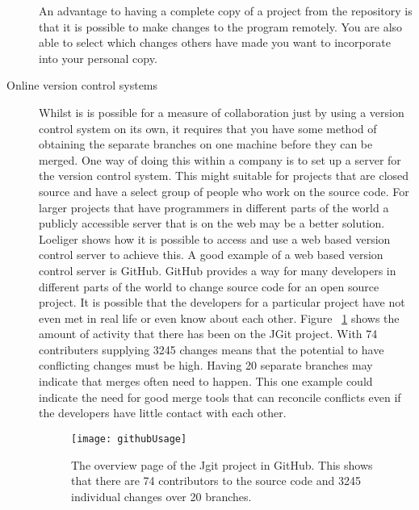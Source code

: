 \begin{description}
  An advantage to having a complete copy of a project from the repository is that it is possible to make changes to the program remotely.  You are also able to select which changes others have made you want to incorporate into your personal copy. 
  \item [Online version control systems]  
  Whilst is is possible for a measure of collaboration just by using a version control system on its own, it requires that you have some method of obtaining the separate branches on one machine before they can be merged.  One way of doing this within a company is to set up a server for the version control system.  This might suitable for projects that are closed source and have a select group of people who work on the source code.  For larger projects that have programmers in different parts of the world a publicly accessible server that is on the web may be a better solution. Loeliger \cite{Loeliger2006} shows how it is possible to access and use a web based version control server to achieve this. A good example of a web based version control server is GitHub.  GitHub provides a way for many developers in different parts of the world to change source code for an open source project.  It is possible that the developers for a particular project have not even met in real life or even know about each other. Figure ~\ref{fig:bgUsage} shows the amount of activity that there has been on the JGit project.  With 74 contributers supplying 3245 changes means that the potential to have conflicting changes must be high. Having 20 separate branches may indicate that merges often need to happen. This one example could indicate the need for good merge tools that can reconcile conflicts even if the developers have little contact with each other.

  \begin{figure}[!t]
   \begin{center}
    \texttt{[image: githubUsage]}
   \end{center}
   \caption{The overview page of the Jgit project in GitHub. This shows that there are 74 contributors to the source code and 3245 individual changes over 20 branches.}
   \label{fig:bgUsage}
  \end{figure}


  
\end{description}

